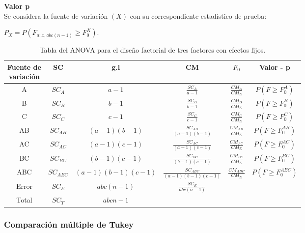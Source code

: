 \textbf{Valor p}\\

Se considera la fuente de variación $(X)$ con su correspondiente estadístico de prueba:

\begin{center}
	$ P_{X} =  P( F_{a;x,abc(n-1)} \geq F_{0}^{X} ) $.\\
\end{center}


\begin{table}[ht]
	\centering
	\begin{tabular}{|c|c|c|c|c|c|}
		\hline
		\makecell{Fuente de \\ variación} & SC & g.l & CM & $F_{0}$ & Valor - p \\ %
		\hline
		A & $SC_{A}$ & $a-1$ & $\frac{SC_{A}}{a-1}$ &  $\frac{CM_{A}}{CM_{E}}$ & $P(F \geq F_{0}^{A} )$ \\
		\hline
		B & $SC_{B}$ & $b-1$ & $\frac{SC_{B}}{b-1}$ &  $\frac{CM_{B}}{CM_{E}}$ & $P(F \geq F_{0}^{B} )$ \\
		\hline
		C & $SC_{C}$ & $c-1$ & $\frac{SC_{C}}{c-1}$ &  $\frac{CM_{C}}{CM_{E}}$ & $P(F \geq F_{0}^{C} )$ \\
		\hline
		AB & $SC_{AB}$ & $(a-1)(b-1)$ & $\frac{SC_{AB}}{(a-1)(b-1)}$ &  $\frac{CM_{AB}}{CM_{E}}$ & $P(F \geq F_{0}^{AB} )$ \\
		\hline
		AC & $SC_{AC}$ & $(a-1)(c-1)$ & $\frac{SC_{AC}}{(a-1)(c-1)}$ &  $\frac{CM_{AC}}{CM_{E}}$ & $P(F \geq F_{0}^{AC} )$ \\
		\hline
		BC & $SC_{BC}$ & $(b-1)(c-1) $ & $\frac{SC_{BC}}{(b-1)(c-1)}$ &  $\frac{CM_{BC}}{CM_{E}}$ & $P(F \geq F_{0}^{BC} )$ \\
		\hline
		ABC & $SC_{ABC}$ & $(a-1)(b-1)(c-1)$ & $\frac{SC_{ABC}}{(a-1)(b-1)(c-1)}$ &  $\frac{CM_{ABC}}{CM_{E}}$ & $P(F \geq F_{0}^{ABC} )$ \\
		\hline
		Error & $SC_{E} $ & $abc(n-1)$ & $\frac{SC_{E}}{abc(n-1)}$ & & \\
		\hline
		Total & $SC_{T}$ & $abcn-1$ & & &  \\
		\hline
	\end{tabular}
	\caption{Tabla del ANOVA para el diseño factorial de tres factores con efectos fijos.}
\end{table}
\FloatBarrier

\subsubsection{Comparación múltiple de Tukey \parencite{montgomery-2017}}

